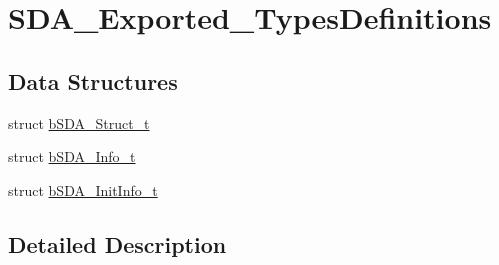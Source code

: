 \hypertarget{group___s_d_a___exported___types_definitions}{}\section{S\+D\+A\+\_\+\+Exported\+\_\+\+Types\+Definitions}
\label{group___s_d_a___exported___types_definitions}
\subsection*{Data Structures}
\begin{DoxyCompactItemize}
\item 
struct \mbox{\hyperlink{structb_s_d_a___struct__t}{b\+S\+D\+A\+\_\+\+Struct\+\_\+t}}
\item 
struct \mbox{\hyperlink{structb_s_d_a___info__t}{b\+S\+D\+A\+\_\+\+Info\+\_\+t}}
\item 
struct \mbox{\hyperlink{structb_s_d_a___init_info__t}{b\+S\+D\+A\+\_\+\+Init\+Info\+\_\+t}}
\end{DoxyCompactItemize}


\subsection{Detailed Description}
